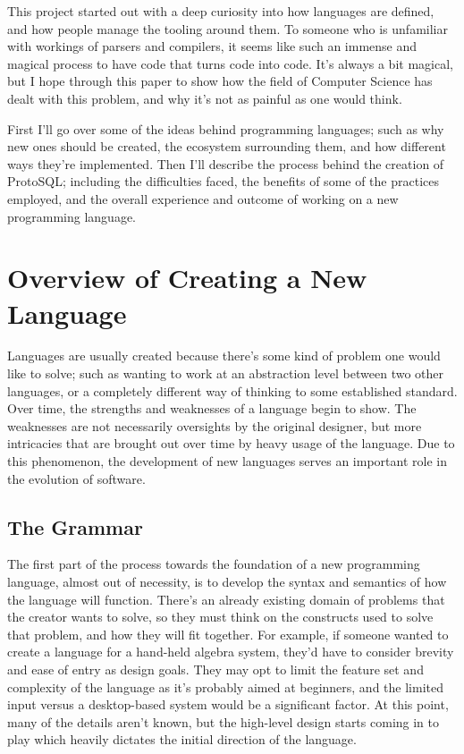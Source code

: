 \documentclass[titlepage]{article}
\begin{document}
		This project started out with a deep curiosity into how languages are defined, and how people manage the tooling around them.  To someone who is unfamiliar with workings of parsers and compilers, it seems like such an immense and magical process to have code that turns code into code.  It's always a bit magical, but I hope through this paper to show how the field of Computer Science has dealt with this problem, and why it's not as painful as one would think.

		First I'll go over some of the ideas behind programming languages; such as why new ones should be created, the ecosystem surrounding them, and how different ways they're implemented.  Then I'll describe the process behind the creation of ProtoSQL; including the difficulties faced, the benefits of some of the practices employed, and the overall experience and outcome of working on a new programming language.

	\section{Overview of Creating a New Language}

		Languages are usually created because there's some kind of problem one would like to solve; such as wanting to work at an abstraction level between two other languages, or a completely different way of thinking to some established standard.  Over time, the strengths and weaknesses of a language begin to show.  The weaknesses are not necessarily oversights by the original designer, but more intricacies that are brought out over time by heavy usage of the language.  Due to this phenomenon, the development of new languages serves an important role in the evolution of software.

		\subsection{The Grammar}

			The first part of the process towards the foundation of a new programming language, almost out of necessity, is to develop the syntax and semantics of how the language will function.  There's an already existing domain of problems that the creator wants to solve, so they must think on the constructs used to solve that problem, and how they will fit together.  For example, if someone wanted to create a language for a hand-held algebra system, they'd have to consider brevity and ease of entry as design goals.  They may opt to limit the feature set and complexity of the language as it's probably aimed at beginners, and the limited input versus a desktop-based system would be a significant factor.  At this point, many of the details aren't known, but the high-level design starts coming in to play which heavily dictates the initial direction of the language.
\end{document}
